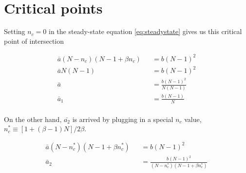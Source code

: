 \chapter{Critical points}
\label{apndx:crita1}
\hspace{\parindent} Setting $n_{c} = 0$ in the steady-state equation \eqref{eq:steadystate} gives us this critical point of intersection

\begin{eqnarray}
\bar{a}(N-n_{c})(N-1 + \beta n_{c}) &&= b(N-1)^{2} \\
\bar{a}N(N-1) &&= b(N-1)^{2} \\
\bar{a} &&= \frac{b(N-1)^{2}}{N(N-1)} \\
\bar{a}_{1} &&= \frac{b(N-1)}{N} \\
\end{eqnarray}

On the other hand, $\bar{a_{2}}$ is arrived by plugging in a special $n_{c}$ value, $n_{c}^{*} \equiv [1+(\beta-1)N]/2\beta$.

\begin{eqnarray}
\bar{a}(N-n_{c}^{*})(N-1 + \beta n_{c}^{*}) &&= b(N-1)^{2} \\
\bar{a}_{2} &&= \frac{b(N-1)^{2}}{(N-n_{c}^{*})(N-1 + \beta n_{c}^{*})}
\end{eqnarray}
